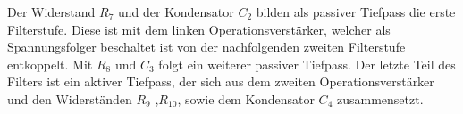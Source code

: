 \noindent
Der Widerstand $R_7$ und der Kondensator $C_2$ bilden als passiver Tiefpass die erste Filterstufe. Diese ist mit dem linken Operationsverstärker, welcher als Spannungsfolger beschaltet ist von der nachfolgenden zweiten Filterstufe entkoppelt. Mit $R_8$ und $C_3$ folgt ein weiterer passiver Tiefpass. Der letzte Teil des Filters ist ein aktiver Tiefpass, der sich aus dem zweiten Operationsverstärker und den Widerständen $R_9$ ,$R_{10}$, sowie dem Kondensator $C_4$ zusammensetzt.